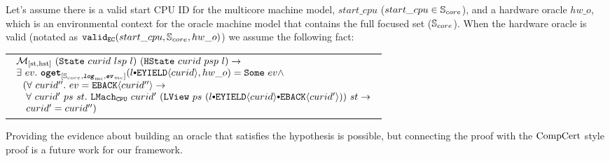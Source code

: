 \begin{hypothesis}
\label{hypo:chapter:conlink:mc-hw-refines-oracle-hypo}
Let's assume  there is a valid start CPU ID for the multicore machine model, 
$start\_cpu$ ($start\_cpu \in {\mathbb{S}_{core}}$), and a hardware oracle $hw\_o$,  
which is an environmental context for the oracle machine model that contains the full focused set (${\mathbb{S}_{core}}$).
When the hardware oracle is valid (notated as $ {{\mathrm{\texttt{valid}}}_{{\mathrm{\texttt{EC}}}}}({start\_cpu}, {{\mathbb{S}_{core}}}, {hw\_o})$) we assume the following fact:
\begin{center}
\begin{tabular}{P{0.95\textwidth}}
$
\begin{array}{l}
\matchstatehstate{(\mcstate{curid}{lsp}{l})}{(\hstate{curid}{psp}{l})} \rightarrow \\
\exists\ ev .\ \oget{\coreset}{\mclog}{\mcevent}{\listconsoppo{\yieldev{curid}}{l}}{hw\_o}{ev} \wedge \\
\ \ (\forall \ curid'' . \ ev = \yieldbackev{curid''} \rightarrow\\
 \ \ \  \forall \ curid' \ ps \ st .\  \hardwarelocalstep{curid'}{(\localview{ps}{(\listconsoppo{\yieldbackev{curid'}}{\listconsoppo{\yieldev{curid}}{l}})})}{st} \rightarrow \\
 \ \  \ curid' = curid'') \\
\end{array}
$
\end{tabular}
\end{center}
\end{hypothesis}

Providing the evidence about building an oracle that satisfies the hypothesis is possible, 
but connecting the proof with the $\mathrm{CompCert}$ style proof is a future work for our framework. 


